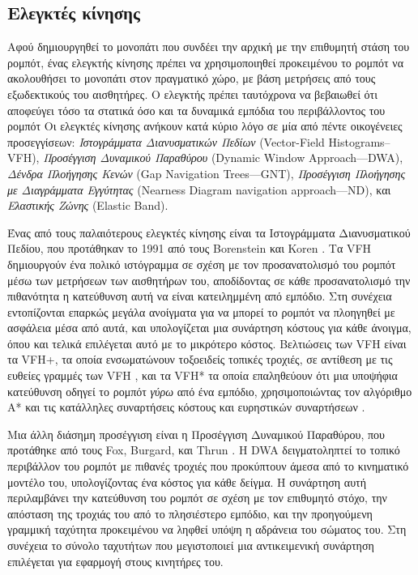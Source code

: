 \subsection{Ελεγκτές κίνησης}
\label{subsection:02_01_02:02}

Αφού δημιουργηθεί το μονοπάτι που συνδέει την αρχική με την επιθυμητή στάση του
ρομπότ, ένας ελεγκτής κίνησης πρέπει να χρησιμοποιηθεί προκειμένου το ρομπότ να
ακολουθήσει το μονοπάτι στον πραγματικό χώρο, με βάση μετρήσεις από τους
εξωδεκτικούς του αισθητήρες. Ο ελεγκτής πρέπει ταυτόχρονα να βεβαιωθεί ότι
αποφεύγει τόσο τα στατικά όσο και τα δυναμικά εμπόδια του περιβάλλοντος του
ρομπότ Οι ελεγκτές κίνησης ανήκουν κατά κύριο λόγο σε μία από πέντε οικογένειες
προσεγγίσεων: \textit{Ιστογράμματα Διανυσματικών Πεδίων} (Vector-Field
Histograms--VFH), \textit{Προσέγγιση Δυναμικού Παραθύρου} (Dynamic Window Approach---DWA),
\textit{Δένδρα Πλοήγησης Κενών} (Gap Navigation Trees---GNT), \textit{Προσέγγιση
Πλοήγησης με Διαγράμματα Εγγύτητας} (Nearness Diagram navigation approach---ND), και
\textit{Ελαστικής Ζώνης} (Elastic Band).

Ένας από τους παλαιότερους ελεγκτές κίνησης είναι τα Ιστογράμματα Διανυσματικού
Πεδίου, που προτάθηκαν το 1991 από τους Borenstein και Koren
\cite{Borenstein1991}. Τα VFH δημιουργούν ένα πολικό ιστόγραμμα σε σχέση με τον
προσανατολισμό του ρομπότ μέσω των μετρήσεων των αισθητήρων του, αποδίδοντας σε
κάθε προσανατολισμό την πιθανότητα η κατεύθυνση αυτή να είναι κατειλημμένη από
εμπόδιο. Στη συνέχεια εντοπίζονται επαρκώς μεγάλα ανοίγματα για να μπορεί το
ρομπότ να πλοηγηθεί με ασφάλεια μέσα από αυτά, και υπολογίζεται μια συνάρτηση
κόστους για κάθε άνοιγμα, όπου και τελικά επιλέγεται αυτό με το μικρότερο
κόστος.  Βελτιώσεις των VFH είναι τα VFH+, τα οποία ενσωματώνουν τοξοειδείς
τοπικές τροχιές, σε αντίθεση με τις ευθείες γραμμές των VFH \cite{Ulrich}, και
τα VFH* τα οποία επαληθεύουν ότι μια υποψήφια κατεύθυνση οδηγεί το ρομπότ
\textit{γύρω} από ένα εμπόδιο, χρησιμοποιώντας τον αλγόριθμο A* και τις
κατάλληλες συναρτήσεις κόστους και ευρηστικών συναρτήσεων \cite{Ulricha}.

Μια άλλη διάσημη προσέγγιση είναι η Προσέγγιση Δυναμικού Παραθύρου, που
προτάθηκε από τους Fox, Burgard, και Thrun \cite{Fox1997}. Η DWA δειγματοληπτεί
το τοπικό περιβάλλον του ρομπότ με πιθανές τροχιές που προκύπτουν άμεσα από το
κινηματικό μοντέλο του, υπολογίζοντας ένα κόστος για κάθε δείγμα. Η συνάρτηση
αυτή περιλαμβάνει την κατεύθυνση του ρομπότ σε σχέση με τον επιθυμητό στόχο,
την απόσταση της τροχιάς του από το πλησιέστερο εμπόδιο, και την προηγούμενη
γραμμική ταχύτητα προκειμένου να ληφθεί υπόψη η αδράνεια του σώματος του. Στη
συνέχεια το σύνολο ταχυτήτων που μεγιστοποιεί μια αντικειμενική συνάρτηση
επιλέγεται για εφαρμογή στους κινητήρες του.

